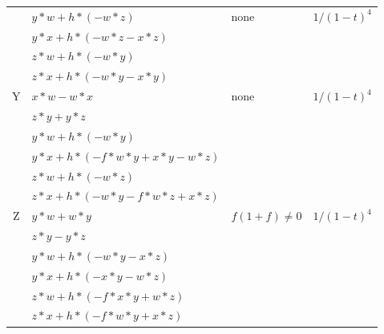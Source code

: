 \documentclass[12]{article}
\begin{document}
\begin{longtable}[c]{|c|p{5.75cm}|p{2.75cm}|c|}
   & $ y*w + h*(-w*z) $ & none & $ 1/(1-t)^4 $ \\  
   & $ y*x + h*(-w*z - x*z ) $ & & \\  
   & $ z*w + h*(-w*y ) $ & & \\ 
   & $ z*x + h*(-w*y - x*y ) $ & &  \\  
\hline
 Y & $ x*w - w*x $ &\multirow{6}{*}{none} &\multirow{6}{*}{$ 1/(1-t)^4 $} \\ 
    & $ z*y + y*z $ & &  \\ 
   & $ y*w + h*(-w*y) $ & & \\
   & $ y*x + h*(-f*w*y + x*y - w*z ) $ & & \\  
   & $ z*w + h*(-w*z ) $ & & \\ 
   & $ z*x + h*(-w*y - f*w*z + x*z ) $ & &  \\  
\hline
 Z & $ y*w + w*y $ &\multirow{6}{*}{ $ f(1+f) \neq 0 $} &\multirow{6}{*}{$ 1/(1-t)^4 $} \\ 
    & $ z*y - y*z $ & &  \\ 
   & $ y*w + h*(-w*y - x*z ) $ & & \\  
   & $ y*x + h*(-x*y - w*z ) $ & & \\  
   & $ z*w + h*(-f*x*y + w*z ) $ & & \\ 
   & $ z*x + h*(-f*w*y + x*z ) $ & &  \\  
\bottomrule
\end{longtable}

\pagebreak
\end{document}
